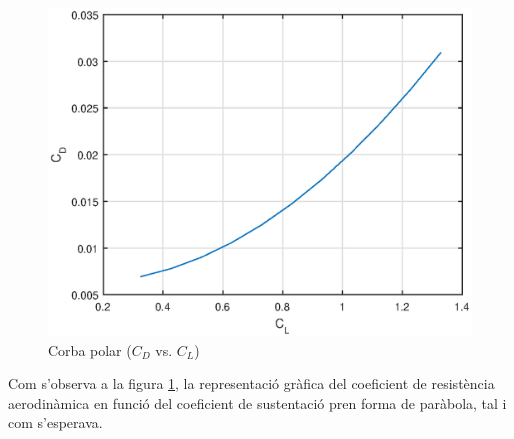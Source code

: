 \begin{figure}[h]
	\centering
	\includegraphics{./plots/polarcurve}
	\caption{Corba polar ($C_{D}$ vs. $C_{L}$)}
	\label{polar}
\end{figure}

Com s'observa a la figura \ref{polar}, la representació gràfica del coeficient de resistència aerodinàmica en funció del coeficient de sustentació pren forma de paràbola, tal i com s'esperava.